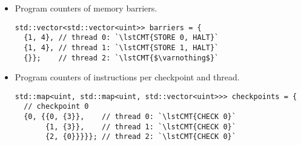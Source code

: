 \begin{itemize}
\begin{lstlisting}[style=c++]
   {0},   // `\lstCMT{STORE 0}`   `\lstCMT{$\leftarrow$ ADDI 1}`
   {1},   // `\lstCMT{LOAD 1}`    `\lstCMT{$\leftarrow$ STORE 0}`
   {2},   // `\lstCMT{CHECK 0}`   `\lstCMT{$\leftarrow$ LOAD 1}`
   {3}},  // `\lstCMT{HALT}`      `\lstCMT{$\leftarrow$ CHECK 0}`
  // thread 1
  {{},    // `\lstCMT{ADDI 1}`    `\lstCMT{$\leftarrow$ $\varnothing$}`
   {0},   // `\lstCMT{STORE 1}`   `\lstCMT{$\leftarrow$ ADDI 1}`
   {1},   // `\lstCMT{LOAD 0}`    `\lstCMT{$\leftarrow$ STORE 1}`
   {2},   // `\lstCMT{CHECK 0}`   `\lstCMT{$\leftarrow$ LOAD 0}`
   {3}},  // `\lstCMT{HALT}`      `\lstCMT{$\leftarrow$ CHECK 0}`
  // thread 2
  {{},    // `\lstCMT{CHECK 0}`   `\lstCMT{$\leftarrow$ $\varnothing$}`
   {0},   // `\lstCMT{ADD 0}`     `\lstCMT{$\leftarrow$ CHECK 0}`
   {1},   // `\lstCMT{ADD 1}`     `\lstCMT{$\leftarrow$ ADD 0}`
   {2},   // `\lstCMT{JZ error}`  `\lstCMT{$\leftarrow$ ADD 1}`
   {3},   // `\lstCMT{EXIT 0}`    `\lstCMT{$\leftarrow$ JZ error}`
   {3}}}; // `\lstCMT{error:}` `\lstCMT{EXIT 1}` `\lstCMT{$\leftarrow$ JZ error}`
\end{lstlisting}

\item Program counters of memory barriers.
\begin{lstlisting}[style=c++]
std::vector<std::vector<uint>> barriers = {
  {1, 4}, // thread 0: `\lstCMT{STORE 0, HALT}`
  {1, 4}, // thread 1: `\lstCMT{STORE 1, HALT}`
  {}};    // thread 2: `\lstCMT{$\varnothing$}`
\end{lstlisting}

\item Program counters of  instructions per checkpoint and thread.
\begin{lstlisting}[style=c++]
std::map<uint, std::map<uint, std::vector<uint>>> checkpoints = {
  // checkpoint 0
  {0, {{0, {3}},    // thread 0: `\lstCMT{CHECK 0}`
       {1, {3}},    // thread 1: `\lstCMT{CHECK 0}`
       {2, {0}}}}}; // thread 2: `\lstCMT{CHECK 0}`
\end{lstlisting}
\end{itemize}



